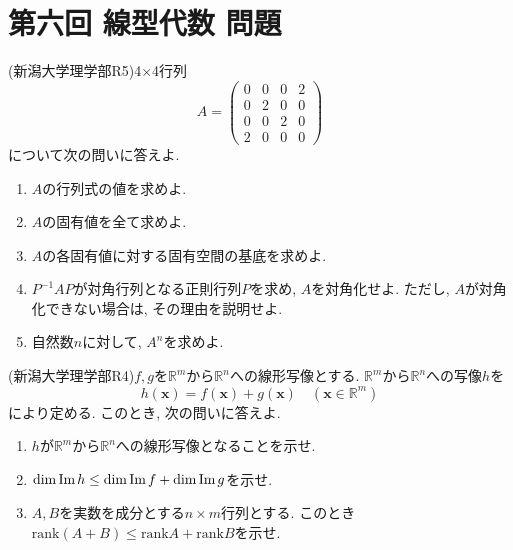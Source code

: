\documentclass[a4j,dvipdfmx]{jsarticle}
\newcommand{\R}{\mathbb{R}}
\newcommand{\rank}{\mathrm{rank}}
\renewcommand{\Im}{\mathrm{Im}\hspace{0.5mm}}
\begin{document}
    \part*{第六回 線型代数 問題}
    \begin{screen}
        (新潟大学理学部R5)4×4行列
        \begin{equation*}
            A=\begin{pmatrix}
                0 & 0 & 0 & 2\\
                0 & 2 & 0 & 0\\
                0 & 0 & 2 & 0\\
                2 & 0 & 0 & 0
            \end{pmatrix}
        \end{equation*}
        について次の問いに答えよ.
        \begin{enumerate}
            \item $A$の行列式の値を求めよ.
            \item $A$の固有値を全て求めよ.
            \item $A$の各固有値に対する固有空間の基底を求めよ.
            \item $P^{-1}AP$が対角行列となる正則行列$P$を求め, $A$を対角化せよ. ただし, $A$が対角化できない場合は, その理由を説明せよ.
            \item 自然数$n$に対して, $A^n$を求めよ.
        \end{enumerate}
    \end{screen}
    \clearpage
    \begin{screen}
        (新潟大学理学部R4)$f,g$を$\R^m$から$\R^n$への線形写像とする. $\R^m$から$\R^n$への写像$h$を
        \begin{equation*}
            h(\bm{x})=f(\bm{x})+g(\bm{x})\quad (\bm{x}\in \R^m)
        \end{equation*}
        により定める. このとき, 次の問いに答えよ.
        \begin{enumerate}
            \item $h$が$\R^m$から$\R^n$への線形写像となることを示せ.
            \item $\dim\Im h\leq \dim\Im f + \dim\Im g$を示せ.
            \item $A,B$を実数を成分とする$n\times m$行列とする. このとき$\rank(A+B)\leq\rank A+\rank B$を示せ.
        \end{enumerate}
    \end{screen}
    \clearpage
\end{document}
